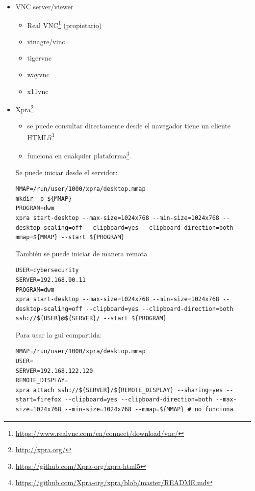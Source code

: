 \documentclass[
  12,
]{scrartcl}
\DeclareRobustCommand{\href}[2]{#2\footnote{\url{#1}}}
\providecommand{\tightlist}{%
  \setlength{\itemsep}{0pt}\setlength{\parskip}{0pt}}
\begin{document}
\begin{itemize}
\item
  VNC server/viewer

  \begin{itemize}
  \item
    \href{https://www.realvnc.com/en/connect/download/vnc/}{Real VNC}
    (propietario)
  \item
    vinagre/vino
  \item
    tigervnc
  \item
    wayvnc
  \item
    x11vnc
  \end{itemize}
\item
  \href{http://xpra.org/}{Xpra}

  \begin{itemize}
  \tightlist
  \item
    se puede consultar directamente desde el navegador
    \href{https://github.com/Xpra-org/xpra-html5}{tiene un cliente
    HTML5}
  \item
    \href{https://github.com/Xpra-org/xpra/blob/master/README.md}{funciona
    en cualquier plataforma}.
  \end{itemize}

  Se puede iniciar desde el servidor:

\begin{verbatim}
MMAP=/run/user/1000/xpra/desktop.mmap
mkdir -p ${MMAP}
PROGRAM=dwm
xpra start-desktop --max-size=1024x768 --min-size=1024x768 --desktop-scaling=off --clipboard=yes --clipboard-direction=both --mmap=${MMAP} --start ${PROGRAM}
\end{verbatim}

  También se puede iniciar de manera remota

\begin{verbatim}
USER=cybersecurity
SERVER=192.168.90.11
PROGRAM=dwm
xpra start-desktop --max-size=1024x768 --min-size=1024x768 --desktop-scaling=off --clipboard=yes --clipboard-direction=both ssh://${USER}@${SERVER}/ --start ${PROGRAM}
\end{verbatim}

  Para usar la gui compartida:

\begin{verbatim}
MMAP=/run/user/1000/xpra/desktop.mmap
USER=
SERVER=192.168.122.120
REMOTE_DISPLAY=
xpra attach ssh://${SERVER}/${REMOTE_DISPLAY} --sharing=yes --start=firefox --clipboard=yes --clipboard-direction=both --max-size=1024x768 --min-size=1024x768 --mmap=${MMAP} # no funciona
\end{verbatim}


\end{itemize}
\end{document}
